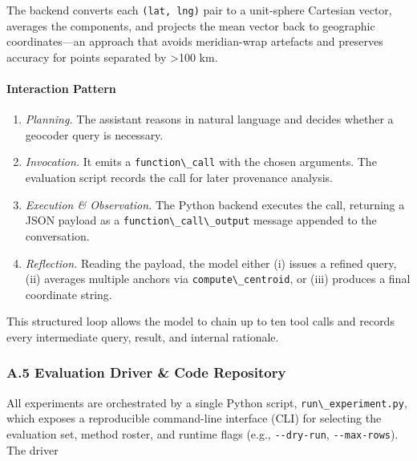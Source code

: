 \documentclass[
  10pt]{article}
\providecommand{\passthrough}[1]{#1}
\providecommand{\tightlist}{%
  \setlength{\itemsep}{0pt}\setlength{\parskip}{0pt}}
\begin{document}
The backend converts each \passthrough{\lstinline!(lat, lng)!} pair to a
unit-sphere Cartesian vector, averages the components, and projects the
mean vector back to geographic coordinates---an approach that avoids
meridian-wrap artefacts and preserves accuracy for points separated by
\textgreater100 km.

\paragraph{Interaction Pattern}\label{interaction-pattern}

\begin{enumerate}
\def\labelenumi{\arabic{enumi}.}
\tightlist
\item
  \emph{Planning.} The assistant reasons in natural language and decides
  whether a geocoder query is necessary.
\item
  \emph{Invocation.} It emits a \passthrough{\lstinline!function\_call!}
  with the chosen arguments. The evaluation script records the call for
  later provenance analysis.
\item
  \emph{Execution \& Observation.} The Python backend executes the call,
  returning a JSON payload as a
  \passthrough{\lstinline!function\_call\_output!} message appended to
  the conversation.
\item
  \emph{Reflection.} Reading the payload, the model either (i) issues a
  refined query, (ii) averages multiple anchors via
  \passthrough{\lstinline!compute\_centroid!}, or (iii) produces a final
  coordinate string.
\end{enumerate}

This structured loop allows the model to chain up to ten tool calls and
records every intermediate query, result, and internal rationale.

\subsubsection{A.5 Evaluation Driver \& Code
Repository}\label{a.5-evaluation-driver-code-repository}

All experiments are orchestrated by a single Python script,
\passthrough{\lstinline!run\_experiment.py!}, which exposes a
reproducible command-line interface (CLI) for selecting the evaluation
set, method roster, and runtime flags (e.g.,
\passthrough{\lstinline!--dry-run!},
\passthrough{\lstinline!--max-rows!}). The driver
\end{document}
